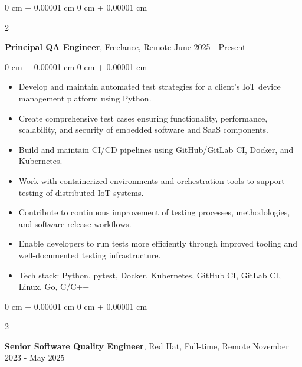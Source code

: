 \documentclass[10pt, letterpaper]{article}
\newenvironment{highlights}{
    \begin{itemize}[
        topsep=0.10 cm,
        parsep=0.10 cm,
        partopsep=0pt,
        itemsep=0pt,
        leftmargin=0 cm + 10pt
    ]
}{
    \end{itemize}
} %
\newenvironment{onecolentry}{
    \begin{adjustwidth}{
        0 cm + 0.00001 cm
    }{
        0 cm + 0.00001 cm
    }
}{
    \end{adjustwidth}
} %
\newenvironment{twocolentry}[2][]{
    \onecolentry
    \def\secondColumn{#2}
    \setcolumnwidth{\fill, 4.5 cm}
    \begin{paracol}{2}
}{
    \switchcolumn \raggedleft \secondColumn
    \end{paracol}
    \endonecolentry
} %
\begin{document}
        \begin{twocolentry}{
            June 2025 - Present
        }
            \textbf{Principal QA Engineer}, Freelance, Remote\end{twocolentry}

        \vspace{0.10 cm}
        \begin{onecolentry}
            \begin{highlights}
                \item Develop and maintain automated test strategies for a client's IoT device management platform using Python.
                \item Create comprehensive test cases ensuring functionality, performance, scalability, and security of embedded software and SaaS components.
                \item Build and maintain CI/CD pipelines using GitHub/GitLab CI, Docker, and Kubernetes.
                \item Work with containerized environments and orchestration tools to support testing of distributed IoT systems.
                \item Contribute to continuous improvement of testing processes, methodologies, and software release workflows.
                \item Enable developers to run tests more efficiently through improved tooling and well-documented testing infrastructure.
                \item Tech stack: Python, pytest, Docker, Kubernetes, GitHub CI, GitLab CI, Linux, Go, C/C++
            \end{highlights}
        \end{onecolentry}

        \vspace{0.2 cm}

        \begin{twocolentry}{
            November 2023 - May 2025
        }
            \textbf{Senior Software Quality Engineer}, Red Hat, Full-time, Remote\end{twocolentry}

        \vspace{0.10 cm}
\end{document}
